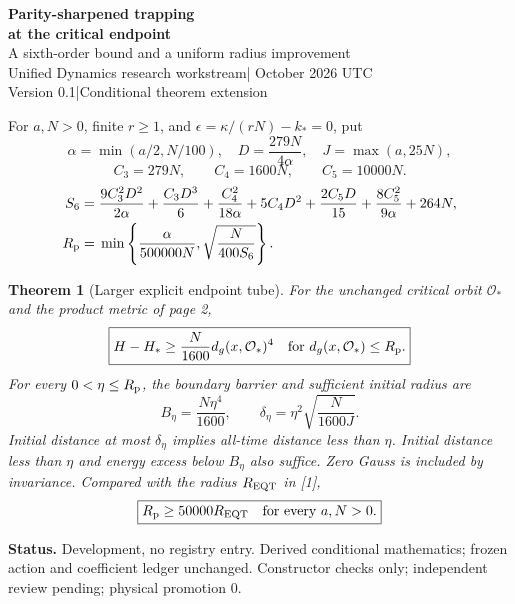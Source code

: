 \documentclass[11pt,a4paper]{article}
\newtheorem{theorem}{Theorem}\newtheorem{lemma}[theorem]{Lemma}
\begin{document}
\begin{center}
{\Large\bfseries Parity-sharpened trapping\\at the critical endpoint}\\[10pt]
{\large A sixth-order bound and a uniform radius improvement}\\[10pt]
Unified Dynamics research workstream\quad | October 2026 UTC\\
Version 0.1\quad |\quad Conditional theorem extension
\end{center}
\begin{abstract}
The frozen critical orbit has an explicit energy-preserving isometric reflection. It reverses all three soft directions and fixes the leading fast-relaxation correction. Three parity cancellations remove the fifth-order loss responsible for the preceding very small sufficient radius. A sixth-order geodesic remainder and quantitative fast-variable completion preserve the same quartic orbit-distance coercivity on a larger explicit tube. An exact positive-coefficient comparison proves a radius improvement of at least 50,000 for every positive kinetic coefficient and matter norm, at each finite rank. No physical tolerance or maximal basin is inferred.
\end{abstract}
For $a,N>0$, finite $r\ge1$, and $\epsilon=\kappa/(rN)-k_*=0$, put
\[
\alpha=\min(a/2,N/100),\quad D=\frac{279N}{4\alpha},\quad J=\max(a,25N),
\]
\[
C_3=279N,\qquad C_4=1600N,\qquad C_5=10000N.
\]
\begin{align*}
S_6={}&\frac{9C_3^2D^2}{2\alpha}+\frac{C_3D^3}{6}
+\frac{C_4^2}{18\alpha}+5C_4D^2
+\frac{2C_5D}{15}+\frac{8C_5^2}{9\alpha}+264N,\\
R_{\rm p}={}&\min\left\{\frac{\alpha}{500000N},\sqrt{\frac{N}{400S_6}}\right\}.
\end{align*}
\begin{theorem}[Larger explicit endpoint tube]\label{th:main}
For the unchanged critical orbit $\mathcal O_*$ and the product metric of page 2,
\[
\boxed{H-H_*\ge\frac{N}{1600}d_g(x,\mathcal O_*)^4
\quad\text{for }d_g(x,\mathcal O_*)\le R_{\rm p}.}
\]
For every $0<\eta\le R_{\rm p}$, the boundary barrier and sufficient initial radius are
\[
B_\eta=\frac{N\eta^4}{1600},\qquad
\delta_\eta=\eta^2\sqrt{\frac{N}{1600J}}.
\]
Initial distance at most $\delta_\eta$ implies all-time distance less than $\eta$. Initial distance less than $\eta$ and energy excess below $B_\eta$ also suffice. Zero Gauss is included by invariance. Compared with the radius $R_{\rm EQT}$ in [1],
\[
\boxed{R_{\rm p}\ge50000R_{\rm EQT}\quad\text{for every }a,N>0.}
\]
\end{theorem}
\textbf{Status.} Development, no registry entry. Derived conditional mathematics; frozen action and coefficient ledger unchanged. Constructor checks only; independent review pending; physical promotion $0$.
\newpage
\end{document}
